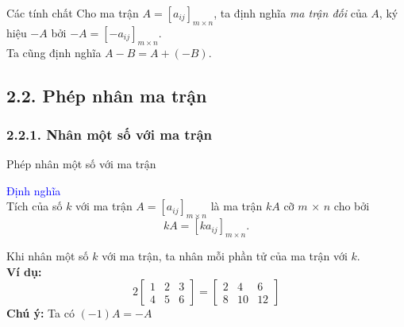 \documentclass[pdf,10pt]{beamer}
\begin{document}
\begin{frame}{Các tính chất}
	Cho ma trận $A=[a_{ij}]_{m \times n}$, ta định nghĩa \emph{ma trận đối} của $A$, ký hiệu $-A$ bởi $-A=[-a_{ij}]_{m \times n}$.\\
	Ta cũng định nghĩa $A-B=A+(-B)$.
	
\end{frame}

\subsection{2.2. Phép nhân ma trận}
\subsubsection{2.2.1. Nhân một số với ma trận}
\begin{frame}{Phép nhân một số với ma trận}
	\begin{tcolorbox}
		\textcolor{blue}{Định nghĩa} \\
		Tích của số $k$ với ma trận $A = [a_{ij}]_{m \times n}$ là ma trận $kA$ cỡ $m$ × $n$ cho bởi
		\begin{displaymath}
			kA = [ka_{ij}]_{ m \times n }.
		\end{displaymath}
	\end{tcolorbox}
	
	Khi nhân một số $k$ với ma trận, ta nhân mỗi phần tử của ma trận với $k$.\\[2mm]
	\textbf{Ví dụ:}
		\begin{displaymath}
			2 
			\left[
			\begin{array}{ccc}
				1  & 2 & 3 \\
				4  & 5 & 6 
			\end{array}
			\right]
			=
			\left[
			\begin{array}{ccc}
				2  & 4 & 6 \\
				8  & 10 & 12 
			\end{array}
			\right]
		\end{displaymath}
	\textbf{Chú ý:}
	Ta có $(-1)A = -A$
\end{frame}
\end{document}
